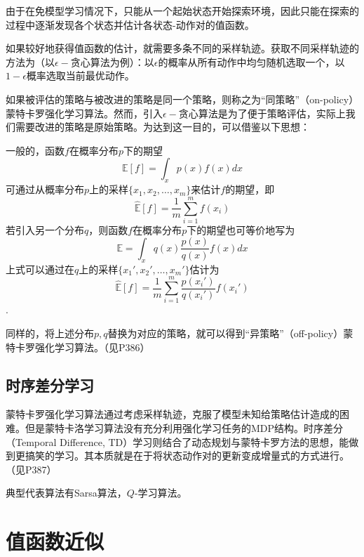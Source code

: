 由于在免模型学习情况下，只能从一个起始状态开始探索环境，因此只能在探索的过程中逐渐发现各个状态并估计各状态-动作对的值函数。

如果较好地获得值函数的估计，就需要多条不同的采样轨迹。获取不同采样轨迹的方法为（以$\epsilon-$贪心算法为例）：以$\epsilon$的概率从所有动作中均匀随机选取一个，以$1-\epsilon$概率选取当前最优动作。

如果被评估的策略与被改进的策略是同一个策略，则称之为``同策略''（on-policy）蒙特卡罗强化学习算法。然而，引入$\epsilon-$贪心算法是为了便于策略评估，实际上我们需要改进的策略是原始策略。为达到这一目的，可以借鉴以下思想：

一般的，函数$f$在概率分布$p$下的期望
\begin{equation}
\mathbb E[f]=\int_xp(x)f(x)dx
\end{equation}
可通过从概率分布$p$上的采样$\{x_1,x_2,\dots,x_m\}$来估计$f$的期望，即
\begin{equation}
\mathbb {\hat E}[f]=\frac{1}{m}\sum_{i=1}^mf(x_i)
\end{equation}
若引入另一个分布$q$，则函数$f$在概率分布$p$下的期望也可等价地写为
\begin{equation}
\mathbb E=\int_x q(x)\frac{p(x)}{q(x)}f(x)dx
\end{equation}
上式可以通过在$q$上的采样$\{x_1',x_2',\dots,x_m'\}$估计为
\begin{equation}
\mathbb {\hat E}[f]=\frac{1}{m}\sum_{i=1}^m\frac{p(x_i')}{q(x_i')}f(x_i')
\end{equation}
.

同样的，将上述分布$p,q$替换为对应的策略，就可以得到``异策略''（off-policy）蒙特卡罗强化学习算法。（见P386）

\subsection{时序差分学习}

蒙特卡罗强化学习算法通过考虑采样轨迹，克服了模型未知给策略估计造成的困难。但是蒙特卡洛学习算法没有充分利用强化学习任务的MDP结构。时序差分（Temporal Difference, TD）学习则结合了动态规划与蒙特卡罗方法的思想，能做到更搞笑的学习。其本质就是在于将状态动作对的更新变成增量式的方式进行。（见P387）

典型代表算法有Sarsa算法，$Q$-学习算法。

\section{值函数近似}

